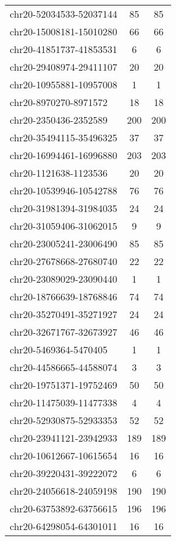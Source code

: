 \documentclass[10pt,letterpaper]{article}
\begin{document}
{\begin{longtable}{lSS}
	chr20-52034533-52037144 & 85     & 85       \\
	chr20-15008181-15010280 & 66     & 66       \\
	chr20-41851737-41853531 & 6      & 6        \\
	chr20-29408974-29411107 & 20     & 20       \\
	chr20-10955881-10957008 & 1      & 1        \\
	chr20-8970270-8971572   & 18     & 18       \\
	chr20-2350436-2352589   & 200    & 200      \\
	chr20-35494115-35496325 & 37     & 37       \\
	chr20-16994461-16996880 & 203    & 203      \\
	chr20-1121638-1123536   & 20     & 20       \\
	chr20-10539946-10542788 & 76     & 76       \\
	chr20-31981394-31984035 & 24     & 24       \\
	chr20-31059406-31062015 & 9      & 9        \\
	chr20-23005241-23006490 & 85     & 85       \\
	chr20-27678668-27680740 & 22     & 22       \\
	chr20-23089029-23090440 & 1      & 1        \\
	chr20-18766639-18768846 & 74     & 74       \\
	chr20-35270491-35271927 & 24     & 24       \\
	chr20-32671767-32673927 & 46     & 46       \\
	chr20-5469364-5470405   & 1      & 1        \\
	chr20-44586665-44588074 & 3      & 3        \\
	chr20-19751371-19752469 & 50     & 50       \\
	chr20-11475039-11477338 & 4      & 4        \\
	chr20-52930875-52933353 & 52     & 52       \\
	chr20-23941121-23942933 & 189    & 189      \\
	chr20-10612667-10615654 & 16     & 16       \\
	chr20-39220431-39222072 & 6      & 6        \\
	chr20-24056618-24059198 & 190    & 190      \\
	chr20-63753892-63756615 & 196    & 196      \\
	chr20-64298054-64301011 & 16     & 16       \\

\end{longtable}}
\end{document}
